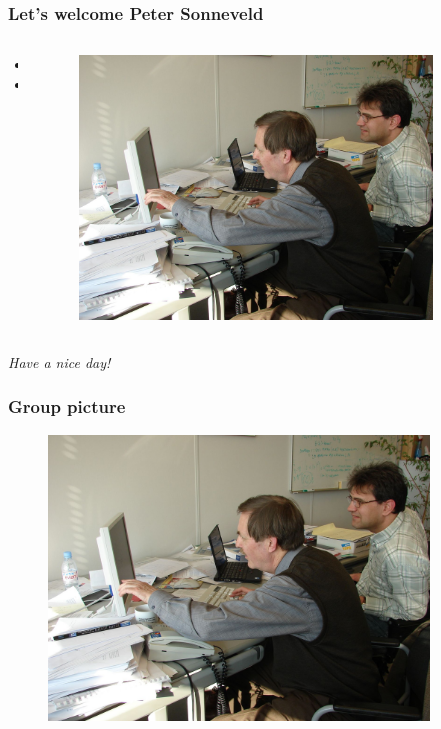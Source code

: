 \documentclass{beamer}
\begin{document}
\begin{frame}
\frametitle{Let's welcome Peter Sonneveld}
 \begin{columns}
 \begin{column}{0.6\textwidth}
 \begin{itemize}
  \item 
  \item 
 \end{itemize}
 \end{column}

 \begin{column}{0.4\textwidth}
  \begin{figure}[t]
  \includegraphics[width=0.9\textwidth]{pics/idr1.jpg}
  \end{figure}
 \end{column}
 \end{columns}
 \vspace{1cm}
 \pause
 \begin{center}
  \textit{Have a nice day!}
 \end{center}
\end{frame}

\begin{frame}
 \frametitle{Group picture}
   \begin{figure}[t]
   \vspace{-0.3cm}
  \includegraphics[width=0.9\textwidth]{pics/idr1.jpg}
  \end{figure}
\end{frame}
\end{document}
